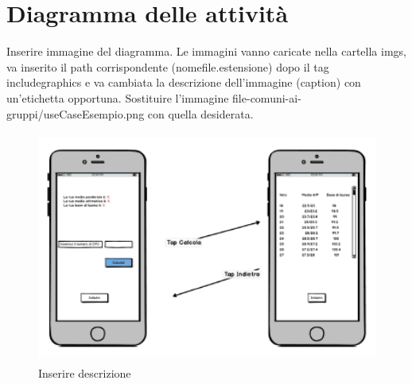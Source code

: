 \section{Diagramma delle attività}

Inserire immagine del diagramma. Le immagini vanno caricate nella cartella imgs, va inserito il path corrispondente (nomefile.estensione) dopo il tag includegraphics e va cambiata la descrizione dell'immagine (caption) con un'etichetta opportuna. Sostituire l'immagine file-comuni-ai-gruppi/useCaseEsempio.png con quella desiderata.

\begin{figure}
	\centering
	\includegraphics[height=3in,width=5in]{imgs/file-comuni-ai-gruppi/ActivityDgEsempio.png}
	\caption{Inserire descrizione}
	\label{fig:prova}
\end{figure}

\clearpage
